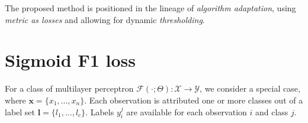 \documentclass[sigconf,natbib,screen=true,review=true,anonymous]{acmart}
\begin{document}
The proposed method is positioned in the lineage of \emph{algorithm adaptation}, using \emph{metric as losses} and allowing for dynamic \emph{thresholding}. 



















\section{Sigmoid F1 loss}
\label{sec:orga8a42f5}

For a class of multilayer perceptron \(\mathcal{F}(\cdot ; \Theta): \mathcal{X} \rightarrow \mathcal{Y}\), we consider a special case, where \(\mathbf{x} = \{x_1, ..., x_n\}\). Each observation is attributed one or more classes out of a label set \(\mathbf{l} = \{l_1, ..., l_c\}\). Labels \(y_{i}^{j}\) are available for each observation \(i\) and class \(j\). 
\end{document}
